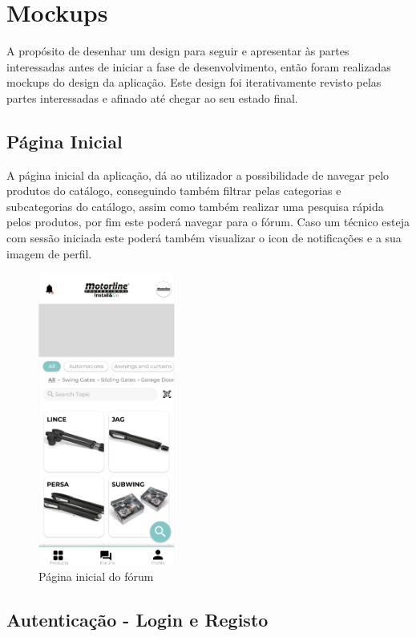 \section{Mockups}
A propósito de desenhar um design para seguir e apresentar às partes interessadas antes de iniciar a 
fase de desenvolvimento, então foram realizadas mockups do design da aplicação. Este design foi 
iterativamente revisto pelas partes interessadas e afinado até chegar ao seu estado final.

\subsection{Página Inicial}

A página inicial da aplicação, dá ao utilizador a possibilidade de navegar pelo produtos do catálogo,
conseguindo também filtrar pelas categorias e subcategorias do catálogo, 
assim como também realizar uma pesquisa rápida pelos produtos, por fim este poderá navegar para o fórum.
Caso um técnico esteja com sessão iniciada este poderá também visualizar o icon de notificações e a sua 
imagem de perfil.

\begin{figure}[htb]
    \centering
    \includegraphics[width=0.4\textwidth]{images/mockups/home_screen.png}
    \caption{Página inicial do fórum}
    \label{fig:23}
\end{figure}

\newpage

\subsection{Autenticação - Login e Registo}

